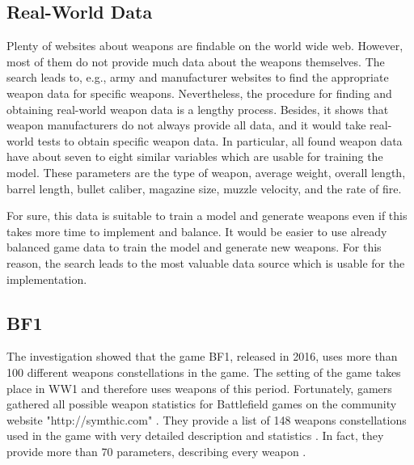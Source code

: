 \documentclass[MGS,Master,english]{twbook}%
\begin{document}
\subsection{Real-World Data}
Plenty of websites about weapons are findable on the world wide web. However, most of them do not provide much data about the weapons themselves. The search leads to, e.g., army and manufacturer websites to find the appropriate weapon data for specific weapons. Nevertheless, the procedure for finding and obtaining real-world weapon data is a lengthy process. Besides, it shows that weapon manufacturers do not always provide all data, and it would take real-world tests to obtain specific weapon data. In particular, all found weapon data have about seven to eight similar variables which are usable for training the model. These parameters are the type of weapon, average weight, overall length, barrel length, bullet caliber, magazine size, muzzle velocity, and the rate of fire.

For sure, this data is suitable to train a model and generate weapons even if this takes more time to implement and balance. It would be easier to use already balanced game data to train the model and generate new weapons. For this reason, the search leads to the most valuable data source which is usable for the implementation.

\subsection{\acl{BF1}}\label{bf1::data}
The investigation showed that the game \ac{BF1}, released in 2016, uses more than 100 different weapons constellations in the game. The setting of the game takes place in \ac{WW1} and therefore uses weapons of this period. Fortunately, gamers gathered all possible weapon statistics for Battlefield games on the community website "http://symthic.com" \cite{symthic::bf1stats}. They provide a list of 148 weapons constellations used in the game with very detailed description and statistics \cite{symthic::bf1stats}. In fact, they provide more than 70 parameters, describing every weapon \cite{symthic::bf1stats}. 
\end{document}
